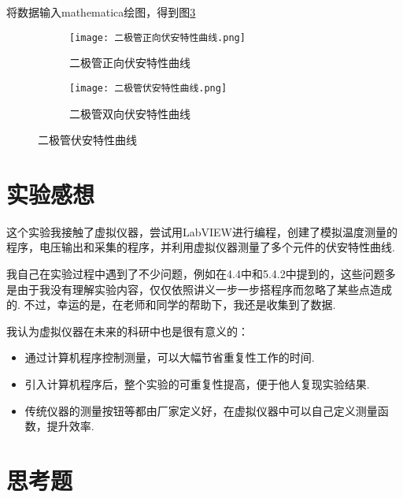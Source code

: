 \documentclass[11pt]{article}
\begin{document}
	将数据输入mathematica绘图，得到图\ref{fig:二极管伏安特性曲线}
	
	\begin{figure}[htbp]
		\centering
		\begin{subfigure}[t]{0.45\textwidth}  %
			\centering
			\texttt{[image: 二极管正向伏安特性曲线.png]}  %
			\caption{二极管正向伏安特性曲线}
			\label{fig:二极管正向伏安特性曲线}
		\end{subfigure}
		\begin{subfigure}[t]{0.45\textwidth}  %
			\centering
			\texttt{[image: 二极管伏安特性曲线.png]}  %
			\caption{二极管双向伏安特性曲线}
			\label{fig:二极管双向伏安特性曲线}
		\end{subfigure}
		\caption{二极管伏安特性曲线}
		\label{fig:二极管伏安特性曲线}
	\end{figure}
	
	
	\section{实验感想}
	这个实验我接触了虚拟仪器，尝试用LabVIEW进行编程，创建了模拟温度测量的程序，电压输出和采集的程序，并利用虚拟仪器测量了多个元件的伏安特性曲线. 
	
	我自己在实验过程中遇到了不少问题，例如在4.4中和5.4.2中提到的，这些问题多是由于我没有理解实验内容，仅仅依照讲义一步一步搭程序而忽略了某些点造成的. 不过，幸运的是，在老师和同学的帮助下，我还是收集到了数据.
	
	我认为虚拟仪器在未来的科研中也是很有意义的：
	\begin{itemize}
		\item 通过计算机程序控制测量，可以大幅节省重复性工作的时间.
		\item 引入计算机程序后，整个实验的可重复性提高，便于他人复现实验结果.
		\item 传统仪器的测量按钮等都由厂家定义好，在虚拟仪器中可以自己定义测量函数，提升效率.
	\end{itemize}

	
	
	\section{思考题}
	
\end{document}
